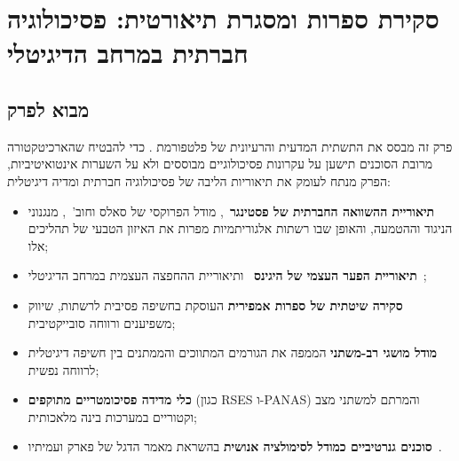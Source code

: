 \chapter{סקירת ספרות ומסגרת תיאורטית: פסיכולוגיה חברתית במרחב הדיגיטלי}
\label{chap:literature_review}

\section{מבוא לפרק}
פרק זה מבסס את התשתית המדעית והרעיונית של פלטפורמת \projectname{}. כדי להבטיח שהארכיטקטורה מרובת הסוכנים תישען על עקרונות פסיכולוגיים מבוססים ולא על השערות אינטואיטיביות, הפרק מנתח לעומק את תיאוריות הליבה של פסיכולוגיה חברתית ומדיה דיגיטלית:
\begin{itemize}
    \item \textbf{תיאוריית ההשוואה החברתית של פסטינגר}~\cite{festinger1954theory}, מודל הפרוקסי של סאלס וחוב'~\cite{suls2002social}, מנגנוני הניגוד וההטמעה, והאופן שבו רשתות אלגוריתמיות מפרות את האיזון הטבעי של תהליכים אלו;
    \item \textbf{תיאוריית הפער העצמי של היגינס}~\cite{higgins1987self} ותיאוריית ההחפצה העצמית במרחב הדיגיטלי~\cite{perloff2014social};
    \item \textbf{סקירה שיטתית של ספרות אמפירית} העוסקת בחשיפה פסיבית לרשתות, שיווק משפיענים ורווחה סובייקטיבית;
    \item \textbf{מודל מושגי רב-משתני} הממפה את הגורמים המתווכים והממתנים בין חשיפה דיגיטלית לרווחה נפשית;
    \item \textbf{כלי מדידה פסיכומטריים מתוקפים} (כגון \textenglish{RSES} ו-\textenglish{PANAS}) והמרתם למשתני מצב וקטוריים במערכות בינה מלאכותית;
    \item \textbf{סוכנים גנרטיביים כמודל לסימולציה אנושית} בהשראת מאמר הדגל של פארק ועמיתיו~\cite{park2023generative}.
\end{itemize}

